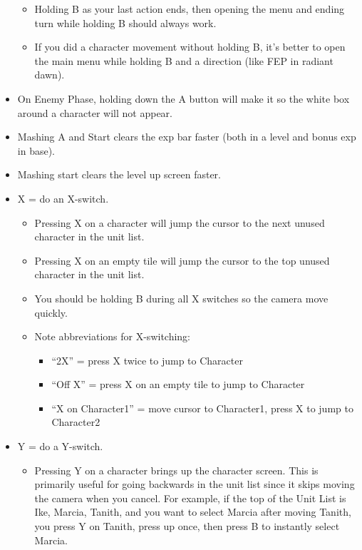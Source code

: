 \begin{itemize}
\begin{itemize}
        \item Holding B as your last action ends, then opening the menu and ending turn while holding B should always work.
        \item If you did a character movement without holding B, it’s better to open the main menu while holding B and a direction (like FEP in radiant dawn).
    \end{itemize}
    \item On Enemy Phase, holding down the A button will make it so the white box around a character will not appear.
    \item Mashing A and Start clears the exp bar faster (both in a level and bonus exp in base).
    \item Mashing start clears the level up screen faster.
    \item X = do an X-switch.
    \begin{itemize}
        \item Pressing X on a character will jump the cursor to the next unused character in the unit list.
        \item Pressing X on an empty tile will jump the cursor to the top unused character in the unit list.
        \item You should be holding B during all X switches so the camera move quickly.
        \item Note abbreviations for X-switching:
        \begin{itemize}
            \item “2X” = press X twice to jump to Character
            \item “Off X” = press X on an empty tile to jump to Character
            \item “X on Character1” = move cursor to Character1, press X to jump to Character2
        \end{itemize}
    \end{itemize}
    \item Y = do a Y-switch.
    \begin{itemize}
        \item Pressing Y on a character brings up the character screen. This is primarily useful for going backwards in the unit list since it skips moving the camera when you cancel. For example, if the top of the Unit List is Ike, Marcia, Tanith, and you want to select Marcia after moving Tanith, you press Y on Tanith, press up once, then press B to instantly select Marcia.
    \end{itemize}
\end{itemize}